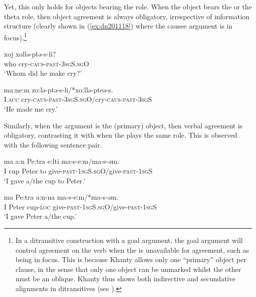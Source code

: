 \documentclass[output=paper
,modfonts
,nonflat]{langsci/langscibook}
\begin{document}
Yet, this only holds for objects bearing the \theme{} role.
When the object bears the \goal{} or the \causee{} theta role, then object agreement is always obligatory, irrespective of information structure (clearly shown in (\ref{ex:dn201118}) where the causee argument is in focus).\footnote{In a ditransitive construction with a goal argument, the goal argument will control agreement on the verb when the \theme{} is unavailable for agreement, such as being in focus.
This is because Khanty allows only one ``primary'' object per clause, in the sense that only one object can be unmarked whilst the other must be an oblique.
Khanty thus shows both indirective and secundative alignments in ditransitives (see \citealt{haspelmath2005,Barany2015}).
}

\begin{exe}
\ex \citet[][149]{dn2011}
\begin{xlist}
\ex
{\gll xoj xollə-ptə-s-li?\\
who cry-\textsc{caus-past-3sgS.sgO}\\
\glt `Whom did he make cry?'} \label{ex:dn201118}

\ex
{\gll ma:ne:m zo:lə-ptə-s-li/*xo:llə-pteə-s.\\
I.\textsc{acc} cry-\textsc{caus-past-3sgS.sgO}/cry-\textsc{caus-past-3sgS}\\
\glt `He made me cry.'} \label{ex:dn201119}

\end{xlist}
\end{exe}

\noindent Similarly, when the \goal{} argument is the (primary) object, then verbal agreement is obligatory, contrasting it with when the \theme{} plays the same role.
This is observed with the following sentence pair.

\begin{exe}
\ex \citet[][148]{dn2011}
\begin{xlist}
\ex
{\gll ma a:n Pe:tra e:lti ma-s-e:m/ma-s-əm.\\
I cup Peter to give-\textsc{past-1sgS.sgO}/give-\textsc{past-1sgS}\\
\glt `I gave a/the cup to Peter.'}

\ex
{\gll ma Pe:tra a:n-na ma-s-e:m/*ma-s-əm.\\
I Peter cup-\textsc{loc} give-\textsc{past-1sgS.sgO}/give-\textsc{past-1sgS}\\
\glt `I gave Peter a/the cup.'}
\end{xlist}
\end{exe}
\end{document}
